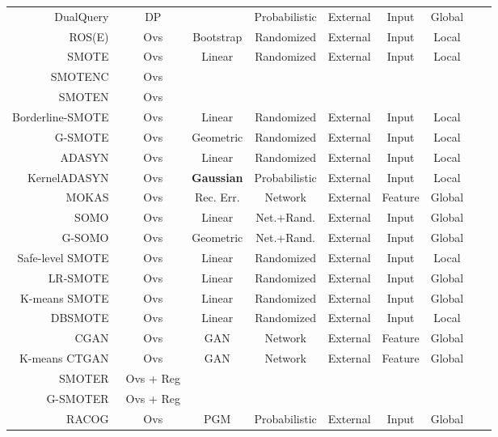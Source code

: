 \documentclass[parskip=full]{scrartcl}
\begin{document}
\begin{longtable}{rcccccccc}
    DualQuery~\cite{gaboardi2014dual} & DP &  & Probabilistic & External & Input & Global \\
    ROS(E)~\cite{menardi2014training} & Ovs & Bootstrap & Randomized & External & Input & Local \\ 
    SMOTE~\cite{chawla2002smote} & Ovs & Linear & Randomized & External & Input & Local \\
    SMOTENC~\cite{chawla2002smote} & Ovs \\
    SMOTEN~\cite{chawla2002smote} & Ovs \\
    Borderline-SMOTE~\cite{han2005borderline} & Ovs & Linear & Randomized & External & Input & Local \\
    G-SMOTE~\cite{douzas2019geometric} & Ovs & Geometric & Randomized & External & Input & Local \\
    ADASYN~\cite{he2008adasyn} & Ovs & Linear & Randomized & External & Input & Local \\
    KernelADASYN~\cite{tang2015kerneladasyn} & Ovs & \textbf{Gaussian} & Probabilistic & External & Input & Local \\
    MOKAS~\cite{lin2017minority} & Ovs & Rec. Err. & Network & External & Feature & Global \\
    SOMO~\cite{douzas2017self} & Ovs & Linear & Net.+Rand. & External & Input & Global \\
    G-SOMO~\cite{douzas2021g} & Ovs & Geometric & Net.+Rand. & External & Input & Global \\
    Safe-level SMOTE~\cite{bunkhumpornpat2009safe} & Ovs & Linear & Randomized & External & Input & Local \\
    LR-SMOTE~\cite{liang2020lr} & Ovs & Linear & Randomized & External & Input & Global \\
    K-means SMOTE~\cite{douzas2018improving} & Ovs & Linear & Randomized & External & Input & Global\\
    DBSMOTE~\cite{bunkhumpornpat2012dbsmote} & Ovs & Linear & Randomized & External & Input & Local\\
    CGAN~\cite{douzas2018effective} & Ovs & GAN & Network & External & Feature & Global \\
    K-means CTGAN~\cite{an2021k} & Ovs & GAN & Network & External & Feature & Global \\
    SMOTER~\cite{torgo2013smote} & Ovs + Reg \\
    G-SMOTER~\cite{camacho2022geometric} & Ovs + Reg \\
    RACOG~\cite{das2014racog} & Ovs & PGM & Probabilistic & External & Input & Global \\

\end{longtable}
\end{document}
